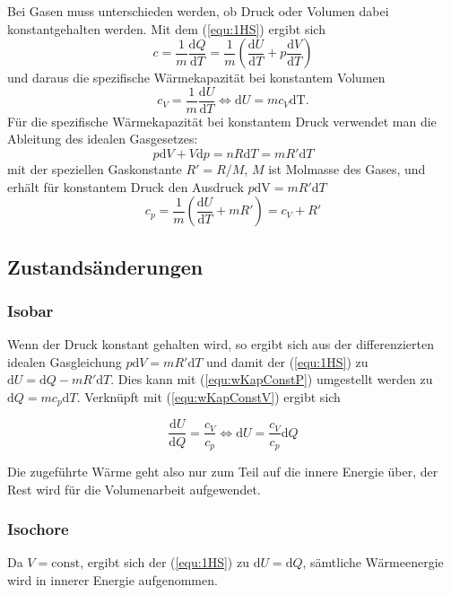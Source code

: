 \documentclass[a4paper]{scrartcl}
\begin{document}
Bei Gasen muss unterschieden werden, ob Druck oder Volumen dabei konstantgehalten werden. Mit dem (\ref{equ:1HS}) ergibt sich
\begin{equation*}
  c = \frac{1}{m}\frac{\text{d}Q}{\text{d}T} = \frac{1}{m}\left( \frac{\text{d}U}{\text{d}{T}} + p \frac{\text{d}V}{\text{d}T} \right)
\end{equation*}
und daraus die spezifische Wärmekapazität bei konstantem Volumen 
\begin{equation}
  c_V = \frac{1}{m}\frac{\text{d}U}{\text{d}{T}} \iff \text{d}U = mc_V\text{dT}.
  \label{equ:wKapConstV}
\end{equation}
Für die spezifische Wärmekapazität bei konstantem Druck verwendet man die Ableitung  des idealen Gasgesetzes:
\begin{equation*}
  p\text{d}V + V\text{d}p = nR \text{d}T = mR'\text{d}T
\end{equation*} mit der speziellen Gaskonstante $R' = R/M$, $M$ ist Molmasse des Gases, und erhält für konstantem Druck den Ausdruck $p\text{dV} = mR'\text{d}T$
\begin{equation}
  c_p = \frac{1}{m}\left(  \frac{\text{d}U}{\text{d}{T}} +mR'\right) = c_V + R'
  \label{equ:wKapConstP}
\end{equation}

\subsection{Zustandsänderungen}
\subsubsection{Isobar}
Wenn der Druck konstant gehalten wird, so ergibt sich aus der differenzierten idealen Gasgleichung $p\text{d}V = mR'\text{d}T$ und damit der (\ref{equ:1HS}) zu $\text{d}U = \text{d}Q - mR'\text{d}T$. Dies kann mit (\ref{equ:wKapConstP}) umgestellt werden zu $\text{d}Q = mc_p\text{d}T$. Verknüpft mit (\ref{equ:wKapConstV}) ergibt sich

\begin{equation*}
  \frac{\text{d}U}{\text{d}Q} = \frac{c_V}{c_p} \iff \text{d}U = \frac{c_V}{c_p}\text{d}Q
\end{equation*}

Die zugeführte Wärme geht also nur zum Teil auf die innere Energie über, der Rest wird für die Volumenarbeit aufgewendet.

\subsubsection{Isochore}
Da $V=\text{const}$, ergibt sich der (\ref{equ:1HS}) zu $\text{d}U = \text{d}Q$, sämtliche Wärmeenergie wird in innerer Energie aufgenommen.
\end{document}
